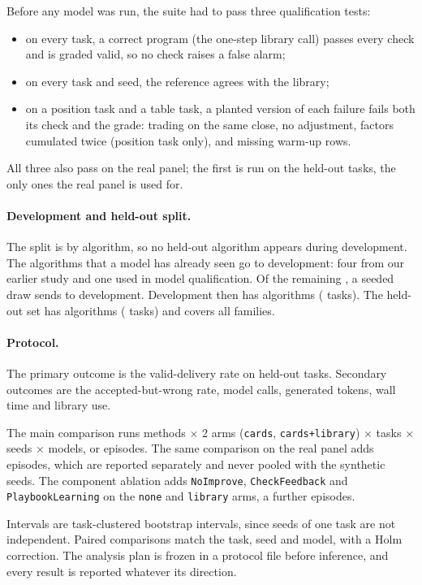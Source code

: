 Before any model was run, the suite had to pass three qualification tests:
\begin{itemize}
\item on every task, a correct program (the one-step library call) passes every check and is
graded valid, so no check raises a false alarm;
\item on every task and seed, the reference agrees with the library;
\item on a position task and a table task, a planted version of each failure fails both its
check and the grade: trading on the same close, no adjustment, factors cumulated twice
(position task only), and missing warm-up rows.
\end{itemize}
All three also pass on the real panel; the first is run on the held-out tasks, the only ones
the real panel is used for.

\paragraph{Development and held-out split.}
The split is by algorithm, so no held-out algorithm appears during development. The
\NForcedDev{} algorithms that a model has already seen go to development: four from our
earlier study and one used in model qualification. Of the remaining \NDrawn{}, a seeded draw
sends \NDrawnDev{} to development. Development then has \NDevAlgorithms{} algorithms
(\NDevTasks{} tasks). The held-out set has \NHeldAlgorithms{} algorithms (\NHeldTasks{} tasks)
and covers all \NFamilies{} families.

\paragraph{Protocol.}
The primary outcome is the valid-delivery rate on held-out tasks. Secondary outcomes are
the accepted-but-wrong rate, model calls, generated tokens, wall time and library use.

The main comparison runs \NMethods{} methods $\times$ 2 arms (\texttt{cards},
\texttt{cards+library}) $\times$ \NHeldTasks{} tasks $\times$ \NSeeds{} seeds $\times$
\NModels{} models, or \NMainEpisodes{} episodes. The same comparison on the real panel adds
\NRealEpisodes{} episodes, which are reported separately and never pooled with the synthetic
seeds. The component ablation adds
\texttt{NoImprove}, \texttt{CheckFeedback} and \texttt{PlaybookLearning} on the
\texttt{none} and \texttt{library} arms, a further \NAblationEpisodes{} episodes.

Intervals are task-clustered bootstrap intervals, since seeds of one task are not
independent. Paired comparisons match the task, seed and model, with a Holm correction. The
analysis plan is frozen in a protocol file before inference, and every result is reported
whatever its direction. 
